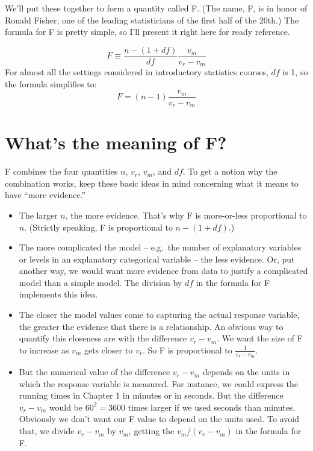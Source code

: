 \documentclass[]{book}
\providecommand{\tightlist}{%
  \setlength{\itemsep}{0pt}\setlength{\parskip}{0pt}}
\begin{document}
We'll put these together to form a quantity called F. (The name, F, is in honor of Ronald Fisher, one of the leading statisticians of the first half of the 20th.) The formula for F is pretty simple, so I'll present it right here for ready reference.

\[F \equiv \frac{n - (1 + df)}{df} \frac{v_m}{v_r - v_m}\]
For almost all the settings considered in introductory statistics courses, \(df\) is 1, so the formula simplifies to:
\[F =  (n-1) \frac{v_m}{v_r - v_m}\]

\hypertarget{whats-the-meaning-of-f}{%
\section{What's the meaning of F?}\label{whats-the-meaning-of-f}}

F combines the four quantities \(n\), \(v_r\), \(v_m\), and \(df\). To get a notion why the combination works, keep these basic ideas in mind concerning what it means to have ``more evidence.''

\begin{itemize}
\tightlist
\item
  The larger \(n\), the more evidence. That's why F is more-or-less proportional to \(n\). (Strictly speaking, F is proportional to \(n - (1+df)\).)
\item
  The more complicated the model -- e.g.~the number of explanatory variables or levels in an explanatory categorical variable -- the less evidence. Or, put another way, we would want more evidence from data to justify a complicated model than a simple model. The division by \(df\) in the formula for F implements this idea.
\item
  The closer the model values come to capturing the actual response variable, the greater the evidence that there is a relationship. An obvious
  way to quantify this closeness are with the difference \(v_r - v_m\). We want the size of F to increase as \(v_m\) gets closer to \(v_r\). So F is proportional to \(\frac{1}{v_r - v_m}\).
\item
  But the numerical value of the difference \(v_r - v_m\) depends on the units in which the response variable is measured. For instance, we could express the running times in Chapter 1 in minutes or in seconds. But the difference \(v_r - v_m\) would be \(60^2 = 3600\) times larger if we used seconds than minutes. Obviously we don't want our F value to depend on the units used. To avoid that, we divide \(v_r - v_m\) by \(v_m\), getting the \(v_m / (v_r - v_m)\) in the formula for F.
\end{itemize}
\end{document}
